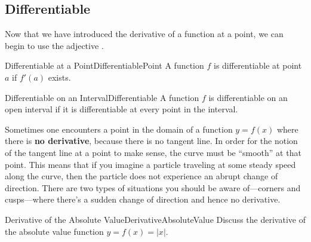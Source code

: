 \subsection{Differentiable}
Now that we have introduced the derivative
of a function at a point, we can begin to use the adjective .

\begin{definition}{Differentiable at a Point}{DifferentiablePoint}
A function $f$ is
differentiable at point $a$ if $f'(a)$ exists.
\end{definition}

\begin{definition}{Differentiable on an Interval}{Differentiable}
A function $f$ is differentiable on an open interval if it is differentiable at every point in the interval.
\end{definition}

Sometimes one encounters a point in the domain of a function $y=f(x)$ where
there is {\bf no derivative}, because there is no tangent line.  In order
for the notion of the tangent line at a point to make sense, the curve must
be ``smooth'' at that point.  This means that if you imagine a particle
traveling at some steady speed along the curve, then the particle does not
experience an abrupt change of direction.  There are two types of
situations you should be aware of---corners and cusps---where there's a
sudden change of direction and hence no derivative.

\begin{example}{Derivative of the Absolute Value}{DerivativeAbsoluteValue}
Discuss the derivative of the absolute value function $y=f(x)=|x|$.
\end{example}

